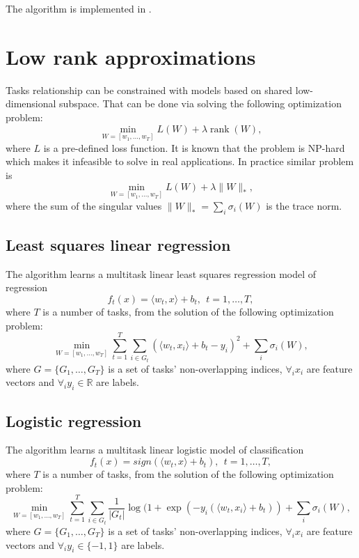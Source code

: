 The algorithm is implemented in .

\section{Low rank approximations}

Tasks relationship can be constrained with models based on shared low-dimensional subspace. That can be done
via solving the following optimization problem:
$$
\min_{W=\left[w_1, \dots, w_T\right]} L (W) + \lambda \mathop{\mathrm{rank}}(W),
$$
where $L$ is a pre-defined loss function. It is known that the problem is NP-hard which makes it infeasible
to solve in real applications. In practice similar problem is
$$
\min_{W=\left[w_1, \dots, w_T\right]} L (W) + \lambda \|W\|_{*},
$$
where the sum of the singular values $\|W\|_{*} = \sum_i \sigma_i(W)$ is the trace norm.

\subsection{Least squares linear regression}

The algorithm learns a multitask linear least squares regression model of regression 
$$
f_t(x) = \langle w_t,x \rangle + b_t, ~~ t = 1, \dots, T,
$$
where $T$ is a number of tasks, from the solution of the following optimization problem:
$$
\min_{W=\left[w_1, \dots, w_T\right]} \sum_{t=1}^{T} \sum_{i \in G_t} \left(\langle w_t,x_i \rangle + b_t - y_i\right)^2
+ \sum_i \sigma_i(W),
$$
where $G = \{ G_1, \dots, G_T \}$ is a set of tasks' non-overlapping indices, $\forall_i x_i$ are feature 
vectors and $\forall_i y_i \in \mathbb{R}$ are labels.

\subsection{Logistic regression}

The algorithm learns a multitask linear logistic model of classification 
$$
f_t(x) = sign (\langle w_t,x \rangle + b_t), ~~ t = 1, \dots, T,
$$
where $T$ is a number of tasks, from the solution of the following optimization problem:
$$
\min_{W=\left[w_1, \dots, w_T\right]} \sum_{t=1}^{T} \sum_{i \in G_t} \frac{1}{|G_t|} \log (1+\exp\left(-y_i(\langle w_t,x_i \rangle + b_t)\right)
+ \sum_i \sigma_i(W),
$$
where $G = \{ G_1, \dots, G_T \}$ is a set of tasks' non-overlapping indices, $\forall_i x_i$ are feature 
vectors and $\forall_i y_i \in \{-1,1\}$ are labels.

